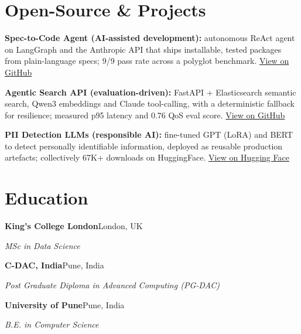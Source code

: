 \documentclass[10pt,a4paper]{article}
\begin{document}
\section{Open-Source \& Projects}
\begin{tight}
  \item \textbf{Spec-to-Code Agent (AI-assisted development):} autonomous ReAct agent on LangGraph and the Anthropic API that ships installable, tested packages from plain-language specs; 9/9 pass rate across a polyglot benchmark. \href{https://github.com/abhijeetscode/Spec-to-Code-Agent}{View on GitHub}
  \item \textbf{Agentic Search API (evaluation-driven):} FastAPI + Elasticsearch semantic search, Qwen3 embeddings and Claude tool-calling, with a deterministic fallback for resilience; measured p95 latency and 0.76 QoS eval score. \href{https://github.com/abhijeetscode/search-agent}{View on GitHub}
  \item \textbf{PII Detection LLMs (responsible AI):} fine-tuned GPT (LoRA) and BERT to detect personally identifiable information, deployed as reusable production artefacts; collectively 67K+ downloads on HuggingFace. \href{https://huggingface.co/ab-ai/pii_model}{View on Hugging Face}
\end{tight}

\section{Education}
{\color{company}\bfseries King's College London}\hfill {\color{muted}London, UK}\par
{\itshape MSc in Data Science}\par\vspace{2pt}
{\color{company}\bfseries C-DAC, India}\hfill {\color{muted}Pune, India}\par
{\itshape Post Graduate Diploma in Advanced Computing (PG-DAC)}\par\vspace{2pt}
{\color{company}\bfseries University of Pune}\hfill {\color{muted}Pune, India}\par
{\itshape B.E. in Computer Science}\par
\end{document}
